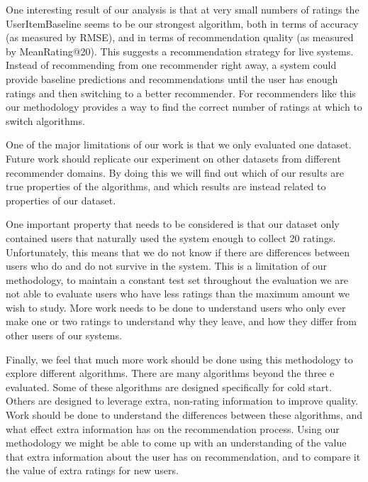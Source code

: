 \documentclass[letterpaper]{sig-alternate}
\begin{document}
  One interesting result of our analysis is that at very small numbers of ratings the UserItemBaseline seems to be our strongest algorithm, both in terms of accuracy (as measured by RMSE), and in terms of recommendation quality (as measured by MeanRating@20).
  This suggests a recommendation strategy for live systems.
  Instead of recommending from one recommender right away, a system could provide baseline predictions and recommendations until the user has enough ratings and then switching to a better recommender.
  For recommenders like this our methodology provides a way to find the correct number of ratings at which to switch algorithms.



  One of the major limitations of our work is that we only evaluated one dataset.
  Future work should replicate our experiment on other datasets from different recommender domains.
  By doing this we will find out which of our results are true properties of the algorithms, and which results are instead related to properties of our dataset.

  One important property that needs to be considered is that our dataset only contained users that naturally used the system enough to collect 20 ratings.
  Unfortunately, this means that we do not know if there are differences between users who do and do not survive in the system.
  This is a limitation of our methodology, to maintain a constant test set throughout the evaluation we are not able to evaluate users who have less ratings than the maximum amount we wish to study.
  More work needs to be done to understand users who only ever make one or two ratings to understand why they leave, and how they differ from other users of our systems.

  Finally, we feel that much more work should be done using this methodology to explore different algorithms.
  There are many algorithms beyond the three e evaluated.
  Some of these algorithms are designed specifically for cold start.
  Others are designed to leverage extra, non-rating information to improve quality.
  Work should be done to understand the differences between these algorithms, and what effect extra information has on the recommendation process.
  Using our methodology we might be able to come up with an understanding of the value that extra information about the user has on recommendation, and to compare it the value of extra ratings for new users.
\end{document}
